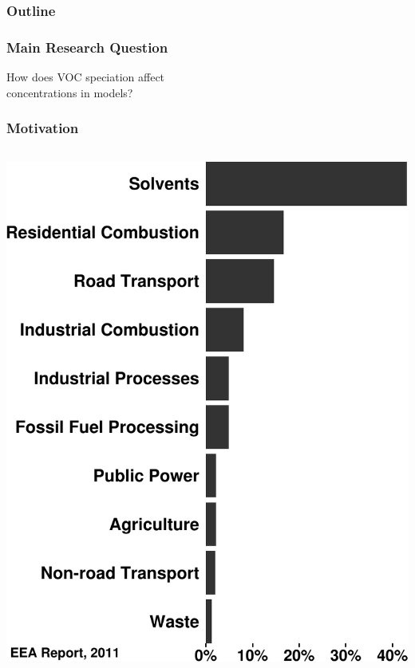 \begin{frame}
    \frametitle{Outline} 
    \tableofcontents[currentsection]
\end{frame} 

\begin{frame}
    \frametitle{Main Research Question} 

    \vspace{-0.7cm}
    \begin{center}
        \LARGE{How does VOC speciation affect\\\vspace{3mm}  concentrations in models?}
    \end{center}
\end{frame}

\begin{frame}
    \frametitle{Motivation}
    \begin{columns}[onlytextwidth]
        \begin{column}{0.45\textwidth}
            \begin{flushleft}
                \vspace{-1.5cm}
                \includegraphics[width=1.10\textwidth]{../Pictures/Sector_conributions} 

\end{flushleft}
\end{column}
\end{columns}
\end{frame}

